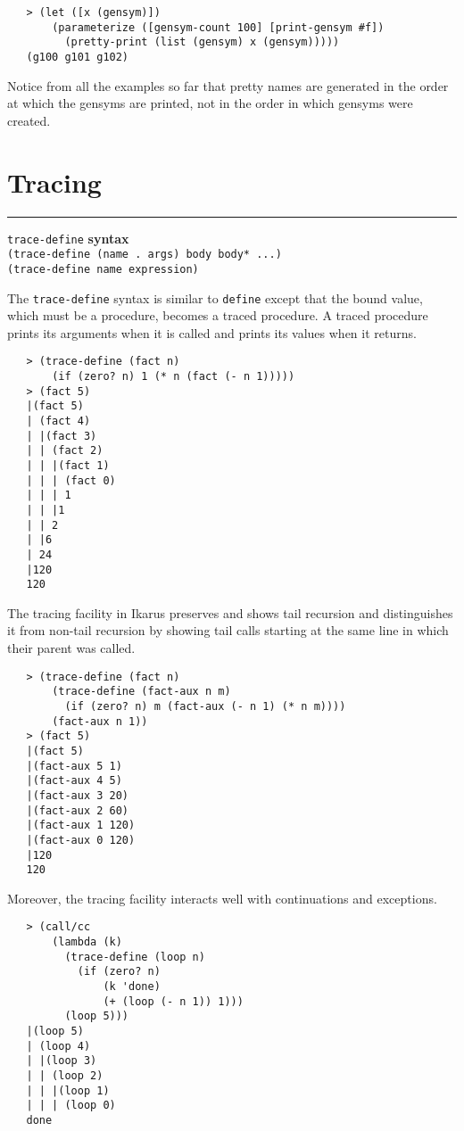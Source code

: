 \documentclass[onecolumn, 12pt, twoside, openright, dvipdfm]{book}
\makeatletter
\newcommand{\idxdefun}[3]{
\vspace{1ex}
\rule{\textwidth}{2pt}
{\index{#1@\texttt{#2}}\label{#1}{\Large\texttt{#2}} \hfill \textbf{#3}}\\
}
\newcommand{\defun}[2]{\idxdefun{#1}{#1}{#2}}
\makeatother
\begin{document}
\begin{verbatim}
   > (let ([x (gensym)])
       (parameterize ([gensym-count 100] [print-gensym #f])
         (pretty-print (list (gensym) x (gensym)))))
   (g100 g101 g102)
\end{verbatim}

Notice from all the examples so far that pretty names are generated
in the order at which the gensyms are printed, not in the order in
which gensyms were created.

\newpage
\section{Tracing}

\defun{trace-define}{syntax}
\texttt{(trace-define (name . args) body body* ...)}\\
\texttt{(trace-define name expression)}

The \texttt{trace-define} syntax is similar to \texttt{define}
except that the bound value, which must be a procedure, becomes a
traced procedure.  A traced procedure prints its arguments when it
is called and prints its values when it returns.  

\begin{verbatim}
   > (trace-define (fact n)
       (if (zero? n) 1 (* n (fact (- n 1)))))
   > (fact 5)
   |(fact 5)
   | (fact 4)
   | |(fact 3)
   | | (fact 2)
   | | |(fact 1)
   | | | (fact 0)
   | | | 1
   | | |1
   | | 2
   | |6
   | 24
   |120
   120
\end{verbatim}

The tracing facility in Ikarus preserves and shows tail recursion
and distinguishes it from non-tail recursion by showing tail calls
starting at the same line in which their parent was called.  

\begin{verbatim}
   > (trace-define (fact n)
       (trace-define (fact-aux n m)
         (if (zero? n) m (fact-aux (- n 1) (* n m))))
       (fact-aux n 1))
   > (fact 5)
   |(fact 5)
   |(fact-aux 5 1)
   |(fact-aux 4 5)
   |(fact-aux 3 20)
   |(fact-aux 2 60)
   |(fact-aux 1 120)
   |(fact-aux 0 120)
   |120
   120
\end{verbatim}

Moreover, the tracing facility interacts well with continuations and
exceptions.

\begin{verbatim}
   > (call/cc
       (lambda (k) 
         (trace-define (loop n)
           (if (zero? n) 
               (k 'done)
               (+ (loop (- n 1)) 1)))
         (loop 5)))
   |(loop 5)
   | (loop 4)
   | |(loop 3)
   | | (loop 2)
   | | |(loop 1)
   | | | (loop 0)
   done
\end{verbatim}
\end{document}
